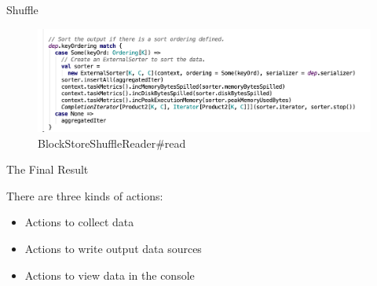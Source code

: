 \begin{frame}[plain,t]{Shuffle} %
	 \\  \vspace{2ex}
	\begin{figure}
		\centering
		\includegraphics[width=1\linewidth]{images/shufflereader003}
		\caption{BlockStoreShuffleReader\#read}
		\label{fig:shufflereader003}
	\end{figure}
	
\end{frame}
\begin{frame}[plain,t]{The Final Result} %
	 \\  \vspace{2ex}

	There are three kinds of actions:
	\begin{itemize}
		\item Actions to collect data
		\item Actions to write output data sources
		\item Actions to view data in the console
	\end{itemize}
\end{frame}

